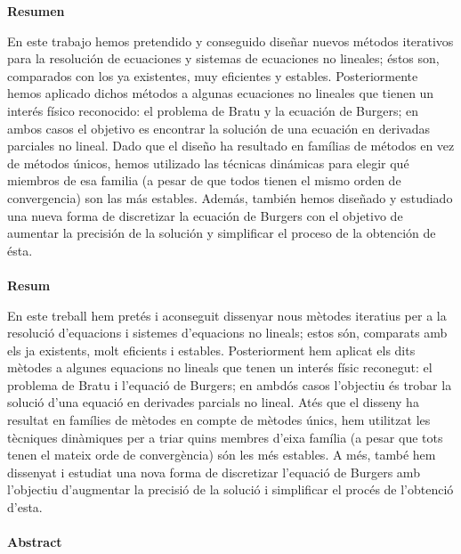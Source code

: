 
\clearpage
\thispagestyle{empty}

{\fontsize{14pt}{1em}\selectfont \textbf{Resumen}}

En este trabajo hemos pretendido y conseguido diseñar nuevos métodos iterativos para la resolución de ecuaciones y sistemas de ecuaciones no lineales; éstos son, comparados con los ya existentes, muy eficientes y estables. Posteriormente hemos aplicado dichos métodos a algunas ecuaciones no lineales que tienen un interés físico reconocido: el problema de Bratu y la ecuación de Burgers; en ambos casos el objetivo es encontrar la solución de una ecuación en derivadas parciales no lineal. Dado que el diseño ha resultado en famílias de métodos en vez de métodos únicos, hemos utilizado las técnicas dinámicas para elegir qué miembros de esa familia (a pesar de que todos tienen el mismo orden de convergencia) son las más estables. Además, también hemos diseñado y estudiado una nueva forma de discretizar la ecuación de Burgers con el objetivo de aumentar la precisión de la solución y simplificar el proceso de la obtención de ésta.\\\\

{\fontsize{14pt}{1em}\selectfont \textbf{Resum}}

En este treball hem pretés i aconseguit dissenyar nous mètodes iteratius per a la resolució d'equacions i sistemes d'equacions no lineals; estos són, comparats amb els ja existents, molt eficients i estables. Posteriorment hem aplicat els dits mètodes a algunes equacions no lineals que tenen un interés físic reconegut: el problema de Bratu i l'equació de Burgers; en ambdós casos l'objectiu és trobar la solució d'una equació en derivades parcials no lineal. Atés que el disseny ha resultat en famílies de mètodes en compte de mètodes únics, hem utilitzat les tècniques dinàmiques per a triar quins membres d'eixa família (a pesar que tots tenen el mateix orde de convergència) són les més estables. A més, també hem dissenyat i estudiat una nova forma de discretizar l'equació de Burgers amb l'objectiu d'augmentar la precisió de la solució i simplificar el procés de l'obtenció d'esta.\\\\

{\fontsize{14pt}{1em}\selectfont \textbf{Abstract}}

